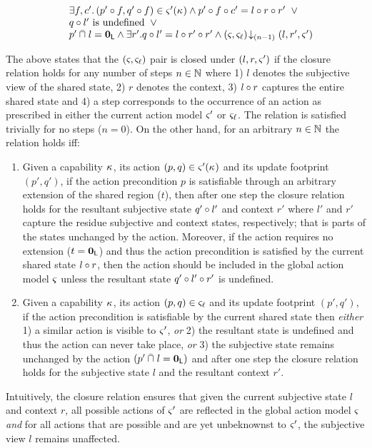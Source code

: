 \begin{definition}
\[\begin{array}{l}
  \hspace*{0.4cm}\exists f, c'.\, (p' \circ f, q' \circ f) \in \varsigma_{}'(\kappa_{}) \land p' \circ f \circ c' =  l \circ r \circ r' \;\;\lor\\
	

		\hspace*{0.4cm}q \circ l' \text{ is undefined} \;\;\lor\\
		\hspace*{0.4cm}p' \mathbin{\bar{\sqcap}}_{} l = \mathbf{0}_{\textsf{L}} \land \exists r'.\,\! q \circ l' = l \circ r' \circ r' \land \left(\varsigma_{}, \varsigma_{\ell}\right) \!\downarrow_{(n-1)} \left(l, r', \varsigma_{}'\right)

\end{array}
\]
\end{definition}

The above states that the $(\varsigma_{}, \varsigma_{\ell})$ pair is closed under $(l, r, \varsigma_{}')$ if the closure relation holds for any number of steps $n \in \mathbb{N}$ where 1) $l$ denotes the subjective view of the shared state, 2) $r$ denotes the context, 3) $l \circ r$ captures the entire shared state  and 4) a step corresponds to the occurrence of an action as prescribed in either the current action model $\varsigma_{}'$ or $\varsigma_{\ell}$. The relation is satisfied trivially for no steps ($n = 0$). On the other hand, for an arbitrary $n\in \mathbb{N}$ the relation holds iff:
\begin{enumerate}
	\item Given a capability $\kappa_{}$, its action $(p, q) \in \varsigma_{}'(\kappa_{})$ and its update footprint $(p', q')$, if the action precondition $p$ is satisfiable through an arbitrary extension of the shared region ($t$), then after one step the closure relation holds for the resultant subjective state $q' \circ l'$ and context $r'$ where $l'$ and $r'$ capture the residue subjective and context states, respectively; that is parts of the states unchanged by the action. Moreover, if the action requires no extension ($t = \mathbf{0}_{\textsf{L}}$) and thus the action precondition is satisfied by the current shared state $l \circ r$, then the action should be included in the global action model $\varsigma_{}$ unless the resultant state $q' \circ l' \circ r'$ is undefined.
	
	\item Given a capability $\kappa_{}$, its action $(p, q) \in \varsigma_{\ell}$ and its update footprint $(p', q')$, if the action precondition is satisfiable by the current shared state then \emph{either} 1) a similar action is visible to $\varsigma_{}'$, \emph{or} 2) the resultant state is undefined and thus the action can never take place, \emph{or} 3) the subjective state remains unchanged by the action $(p' \mathbin{\bar{\sqcap}}_{} l = \mathbf{0}_{\textsf{L}} )$ and after one step the closure relation holds for the subjective state $l$ and the resultant context $r'$.
\end{enumerate}
Intuitively, the closure relation ensures that given the current subjective state $l$ and context $r$, all possible actions of $\varsigma_{}'$ are reflected in the global action model $\varsigma_{}$ \emph{and} for all actions that are possible and are yet unbeknownst to $\varsigma_{}'$, the subjective view $l$ remains unaffected.

